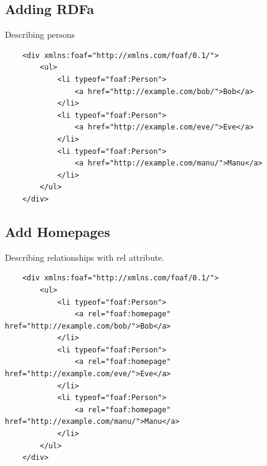 \documentclass[11pt]{article}
\theoremstyle{definition}
\begin{document}
\subsection{Adding RDFa}
Describing persons

\begin{verbatim}
    <div xmlns:foaf="http://xmlns.com/foaf/0.1/">
        <ul>
            <li typeof="foaf:Person">
                <a href="http://example.com/bob/">Bob</a>
            </li>
            <li typeof="foaf:Person">
                <a href="http://example.com/eve/">Eve</a>
            </li>
            <li typeof="foaf:Person">
                <a href="http://example.com/manu/">Manu</a>
            </li>
        </ul>
    </div>  
\end{verbatim}

\subsection{Add Homepages}
Describing
relationships
with rel attribute.

\begin{verbatim}
    <div xmlns:foaf="http://xmlns.com/foaf/0.1/">
        <ul>
            <li typeof="foaf:Person">
                <a rel="foaf:homepage" href="http://example.com/bob/">Bob</a>
            </li>
            <li typeof="foaf:Person">
                <a rel="foaf:homepage" href="http://example.com/eve/">Eve</a>
            </li>
            <li typeof="foaf:Person">
                <a rel="foaf:homepage" href="http://example.com/manu/">Manu</a>
            </li>
        </ul>
    </div>
\end{verbatim}
\end{document}
